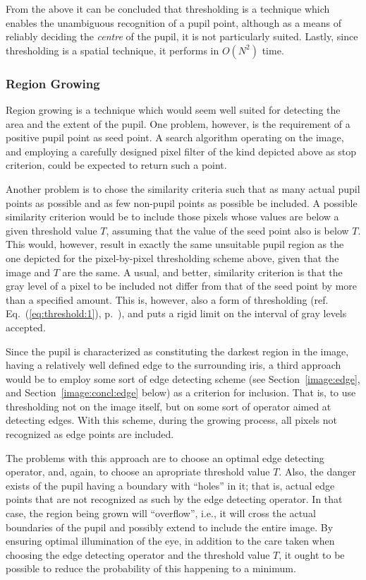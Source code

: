 From the above it can be concluded that thresholding is a technique
which enables the unambiguous recognition of a pupil point, although
as a means of reliably deciding the {\em centre\/} of the pupil, it is
not particularly suited.  Lastly, since thresholding is a spatial
technique, it performs in $O(N^{2})$ time.

\subsubsection{Region Growing}

Region growing is a technique which would seem well suited for
detecting the area and the extent of the pupil.  One problem, however,
is the requirement of a positive pupil point as seed point.  A search
algorithm operating on the image, and employing a carefully designed
pixel filter of the kind depicted above as stop criterion, could be
expected to return such a point.

Another problem is to chose the similarity criteria such that as many
actual pupil points as possible and as few non-pupil points as
possible be included.  A possible similarity criterion would be to
include those pixels whose values are below a given threshold value
$T$, assuming that the value of the seed point also is below $T$.
This would, however, result in exactly the same unsuitable pupil
region as the one depicted for the pixel-by-pixel thresholding scheme
above, given that the image and $T$ are the same.  A usual, and
better, similarity criterion is that the gray level of a pixel to be
included not differ from that of the seed point by more than a
specified amount.  This is, however, also a form of thresholding (ref.
Eq.~(\ref{eq:threshold:1}), p.~\pageref{eq:threshold:1}), and puts a
rigid limit on the interval of gray levels accepted.

Since the pupil is characterized as constituting the darkest region in
the image, having a relatively well defined edge to the surrounding
iris, a third approach would be to employ some sort of edge detecting
scheme (see Section~\ref{image:edge}, and
Section~\ref{image:concl:edge} below) as a criterion for inclusion.
That is, to use thresholding not on the image itself, but on some sort
of operator aimed at detecting edges.  With this scheme, during the
growing process, all pixels not recognized as edge points are
included.  

The problems with this approach are to choose an optimal edge
detecting operator, and, again, to choose an apropriate threshold
value $T$.  Also, the danger exists of the pupil having a boundary
with ``holes'' in it; that is, actual edge points that are not
recognized as such by the edge detecting operator.  In that case, the
region being grown will ``overflow'', i.e., it will cross the actual
boundaries of the pupil and possibly extend to include the entire
image.  By ensuring optimal illumination of the eye, in addition to
the care taken when choosing the edge detecting operator and the
threshold value $T$, it ought to be possible to reduce the probability
of this happening to a minimum.


